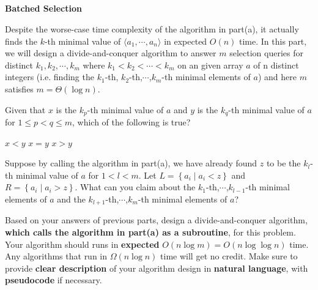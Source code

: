 \begin{parts}
\newpage

\part{} \textbf{Batched Selection} \par

Despite the worse-case time complexity of the algorithm in part(a), it actually finds the $k$-th minimal value of \(\langle a_1,\cdots,a_n\rangle\) in expected $O(n)$ time. In this part, we will design a divide-and-conquer algorithm to answer $m$ selection queries for distinct $k_1, k_2, \cdots, k_m$ where $k_1 < k_2 < \cdots < k_m$ on an given array $a$ of n distinct integers (i.e. finding the $k_1$-th, $k_2$-th,$\cdots$,$k_m$-th minimal elements of $a$) and here $m$ satisfies $m = \Theta(\log n)$.

\begin{subparts}
    \subpart[1] Given that $x$ is the $k_p$-th minimal value of $a$ and $y$ is the $k_q$-th minimal value of $a$ for $1 \leq p < q \leq m$, which of the following is true?
    
    \begin{oneparcheckboxes}
        \choice $x < y$
        \choice $x = y$
        \choice $x > y$
    \end{oneparcheckboxes}

    

    \subpart[2] Suppose by calling the algorithm in part(a), we have already found $z$ to be the $k_l$-th minimal value of $a$ for $1 < l < m$. Let $L = \left\{a_i \mid a_i < z\right\}$ and $R = \left\{a_i \mid a_i > z\right\}$. What can you claim about the $k_1$-th,$\cdots$,$k_{l-1}$-th minimal elements of $a$ and the $k_{l+1}$-th,$\cdots$,$k_{m}$-th minimal elements of $a$?
    
    \begin{solution}
    \vspace{1in}
    \end{solution}
    
    \subpart[6] Based on your answers of previous parts, design a divide-and-conquer algorithm, \textbf{which calls the algorithm in part(a) as a subroutine}, for this problem. Your algorithm should runs in \textbf{expected} $O(n \log m) = O(n \log \log n)$ time. Any algorithms that run in $\Omega(n \log n)$ time will get no credit. Make sure to provide \textbf{clear description} of your algorithm design in \textbf{natural language}, with \textbf{pseudocode} if necessary.
    

\end{subparts}
\end{parts}
